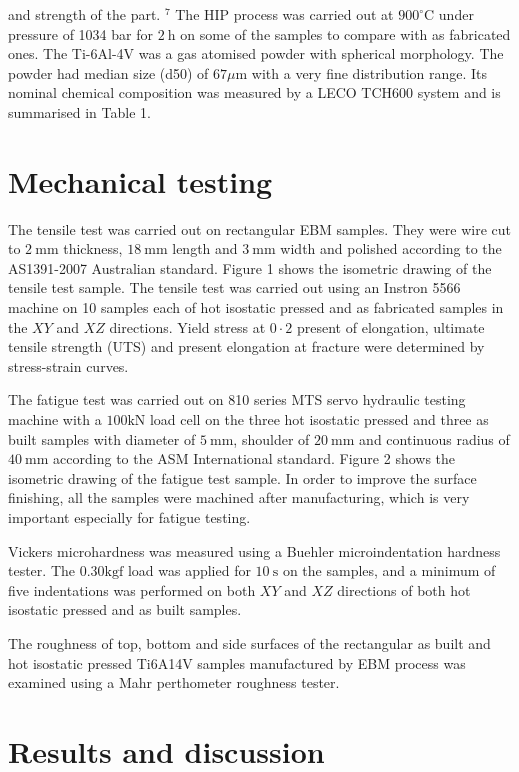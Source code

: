 \documentclass[10pt]{article}
\begin{document}
and strength of the part. ${ }^{7}$ The HIP process was carried out at $900^{\circ} \mathrm{C}$ under pressure of 1034 bar for $2 \mathrm{~h}$ on some of the samples to compare with as fabricated ones. The Ti-6Al-4V was a gas atomised powder with spherical morphology. The powder had median size (d50) of $67 \mu \mathrm{m}$ with a very fine distribution range. Its nominal chemical composition was measured by a LECO TCH600 system and is summarised in Table 1.

\section*{Mechanical testing}
The tensile test was carried out on rectangular EBM samples. They were wire cut to $2 \mathrm{~mm}$ thickness, $18 \mathrm{~mm}$ length and $3 \mathrm{~mm}$ width and polished according to the AS1391-2007 Australian standard. Figure 1 shows the isometric drawing of the tensile test sample. The tensile test was carried out using an Instron 5566 machine on 10 samples each of hot isostatic pressed and as fabricated samples in the $X Y$ and $X Z$ directions. Yield stress at $0 \cdot 2$ present of elongation, ultimate tensile strength (UTS) and present elongation at fracture were determined by stress-strain curves.

The fatigue test was carried out on 810 series MTS servo hydraulic testing machine with a $100 \mathrm{kN}$ load cell on the three hot isostatic pressed and three as built samples with diameter of $5 \mathrm{~mm}$, shoulder of $20 \mathrm{~mm}$ and continuous radius of $40 \mathrm{~mm}$ according to the ASM International standard. Figure 2 shows the isometric drawing of the fatigue test sample. In order to improve the surface finishing, all the samples were machined after manufacturing, which is very important especially for fatigue testing.

Vickers microhardness was measured using a Buehler microindentation hardness tester. The $0.30 \mathrm{kgf}$ load was applied for $10 \mathrm{~s}$ on the samples, and a minimum of five indentations was performed on both $X Y$ and $X Z$ directions of both hot isostatic pressed and as built samples.

The roughness of top, bottom and side surfaces of the rectangular as built and hot isostatic pressed Ti6A14V samples manufactured by EBM process was examined using a Mahr perthometer roughness tester.

\section*{Results and discussion}
\end{document}
